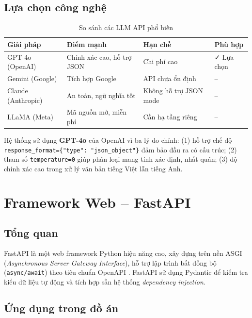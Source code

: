 \documentclass[../DoAn.tex]{subfiles}
\begin{document}
\subsection{Lựa chọn công nghệ}

\begin{table}[ht]
\centering
\caption{So sánh các LLM API phổ biến}
\label{tab:llm-comparison}
\begin{tabular}{|l|l|l|l|}
\hline
\textbf{Giải pháp} & \textbf{Điểm mạnh} & \textbf{Hạn chế} & \textbf{Phù hợp} \\
\hline
GPT-4o (OpenAI) & Chính xác cao, hỗ trợ JSON & Chi phí cao & ✓ Lựa chọn \\
Gemini (Google) & Tích hợp Google & API chưa ổn định & -- \\
Claude (Anthropic) & An toàn, ngữ nghĩa tốt & Không hỗ trợ JSON mode & -- \\
LLaMA (Meta) & Mã nguồn mở, miễn phí & Cần hạ tầng riêng & -- \\
\hline
\end{tabular}
\end{table}

Hệ thống sử dụng \textbf{GPT-4o} của OpenAI \cite{openai2024gpt4o} vì ba lý do chính: (1) hỗ trợ chế độ \texttt{response\_format=\{"type": "json\_object"\}} đảm bảo đầu ra có cấu trúc; (2) tham số \texttt{temperature=0} giúp phân loại mang tính xác định, nhất quán; (3) độ chính xác cao trong xử lý văn bản tiếng Việt lẫn tiếng Anh.

\section{Framework Web -- FastAPI}

\subsection{Tổng quan}

FastAPI là một web framework Python hiệu năng cao, xây dựng trên nền ASGI (\textit{Asynchronous Server Gateway Interface}), hỗ trợ lập trình bất đồng bộ (\texttt{async/await}) theo tiêu chuẩn OpenAPI \cite{fastapi2024docs}. FastAPI sử dụng Pydantic để kiểm tra kiểu dữ liệu tự động và tích hợp sẵn hệ thống \textit{dependency injection}.

\subsection{Ứng dụng trong đồ án}
\end{document}
